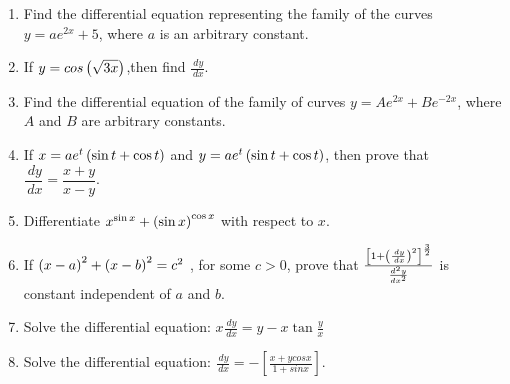 \begin{enumerate}


\item Find the differential equation representing the family of the curves\\
$y=ae^{2x}+5$, where $a$ is an arbitrary constant.

\item If $y=cos \left(\sqrt{3x}\right)$,then find $\frac{\,dy}{\,dx}$.

\item Find the differential equation of the family of curves ${y} = Ae^{2x} + Be^{-2x}$, 
where $A$ and $B$ are arbitrary constants. 

\item If $ x = ae^{t}\left(\sin t + \cos t\right)$ and $y = ae^{t}\left(\sin t + \cos t\right)$,
then prove that \\
$\dfrac{\,dy}{\,dx} = \dfrac{x+y}{x-y}$.

\item Differentiate $ x^{\sin x} + \left(\sin x\right)^{\cos x}$ with respect to $x$.

\item If $\left(x-a\right)^2 + \left(x-b\right)^2 = {c}^2$ , for some $c > 0$, prove that
$ \frac{\left[ 1 + \left(\frac{\,dy}{\,dx}\right)^2 \right]^\frac{3}{2}}{\frac{d^2 y}{dx^2}} $ 
is constant independent of $a$ and $b$.

\item Solve the differential equation:
$x\frac{\,dy}{\,dx} = y - x\tan{\frac{y}{x}}$

\item Solve the differential equation:
$\frac{\,dy}{\,dx} =-\left[\frac{x + ycosx}{ 1 + sinx}\right]$.
\end{enumerate}
